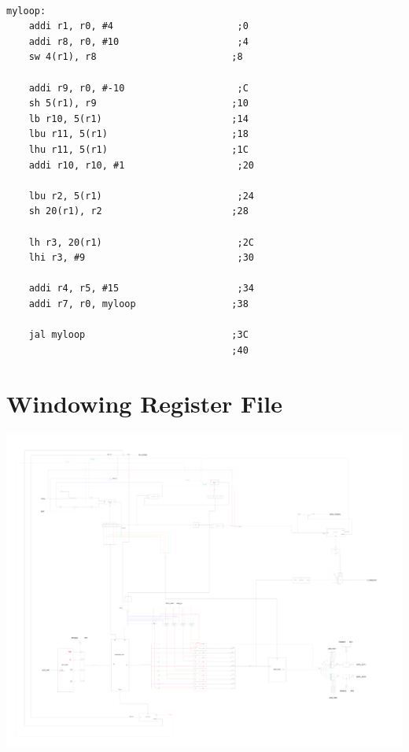 \begin{lstlisting}[style=mips,caption={Load \& Store DLX Assembly example},label=asm_ldstr]

myloop:
    addi r1, r0, #4                      ;0
    addi r8, r0, #10                     ;4
    sw 4(r1), r8                        ;8
    
    addi r9, r0, #-10                    ;C
    sh 5(r1), r9                        ;10
    lb r10, 5(r1)                       ;14
    lbu r11, 5(r1)                      ;18
    lhu r11, 5(r1)                      ;1C
    addi r10, r10, #1                    ;20

    lbu r2, 5(r1)                        ;24
    sh 20(r1), r2                       ;28
    
    lh r3, 20(r1)                        ;2C
    lhi r3, #9                           ;30
    
    addi r4, r5, #15                     ;34
    addi r7, r0, myloop                 ;38
    
    jal myloop        	                ;3C
                                        ;40

\end{lstlisting}





\newappendix\label{ap4}
\section{Windowing Register File}
 \mbox{} \begin{center}
	\begin{sideways}
		\begin{minipage}{1\linewidth}
			\includegraphics[width=1\textwidth]{chapters/11_Appendix/images/wrf.pdf}
			\label{figure:wrf_complex}
		\end{minipage}
	\end{sideways}
\end{center}
